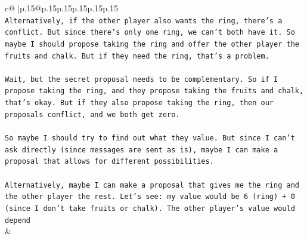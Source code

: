 \documentclass{article}
\begin{document}
{\begin{supertabular}{c@{$\;$}|p{.15\linewidth}@{}p{.15\linewidth}p{.15\linewidth}p{.15\linewidth}p{.15\linewidth}p{.15\linewidth}}
{{{\\ 
\texttt{Alternatively, if the other player also wants the ring, there's a conflict. But since there's only one ring, we can't both have it. So maybe I should propose taking the ring and offer the other player the fruits and chalk. But if they need the ring, that's a problem.} \\
\\ 
\texttt{Wait, but the secret proposal needs to be complementary. So if I propose taking the ring, and they propose taking the fruits and chalk, that's okay. But if they also propose taking the ring, then our proposals conflict, and we both get zero.} \\
\\ 
\texttt{So maybe I should try to find out what they value. But since I can't ask directly (since messages are sent as is), maybe I can make a proposal that allows for different possibilities.} \\
\\ 
\texttt{Alternatively, maybe I can make a proposal that gives me the ring and the other player the rest. Let's see: my value would be 6 (ring) + 0 (since I don't take fruits or chalk). The other player's value would depend} \\
            }
        }
    }
    & \\ \\


\end{supertabular}}
\end{document}

